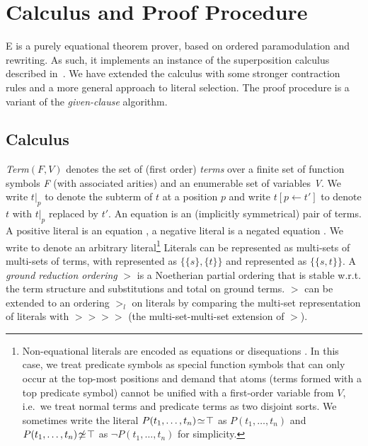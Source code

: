 \documentclass{article}
\begin{document}
\section{Calculus and Proof Procedure}
\label{sec:calculus}

E is a purely equational theorem prover, based on ordered
paramodulation and rewriting. As such, it implements an instance of
the superposition calculus described in~\cite{BG94}. We have extended
the calculus with some stronger contraction rules and a more general
approach to literal selection. The proof procedure is a variant of the
\emph{given-clause} algorithm.


\subsection{Calculus}

\emph{Term}$(F,V)$ denotes the set of (first order)
\emph{terms} over a finite set of function symbols \emph{F} (with
associated arities) and an enumerable set of variables
\emph{V}. We write $t|_p$ to denote the
subterm of $t$ at a position $p$ and write
$t[p\leftarrow t']$ to denote $t$ with $t|_p$ replaced by $t'$. An
equation  is an (implicitly symmetrical)
pair of terms. A positive literal is an equation
, a negative literal is a negated equation .  We
write  to denote an arbitrary
literal\footnote{Non-equational literals are encoded as equations or
  disequations . In this case, we
  treat predicate symbols as special function symbols that can only
  occur at the top-most positions and demand that atoms (terms formed
  with a top predicate symbol) cannot be unified with a first-order
  variable from $V$, i.e.\ we treat normal terms and predicate terms
  as two disjoint sorts. We sometimes write the literal $P(t_1,
    \ldots, t_n)\!\simeq\!\top$ as $P(t_1, \ldots, t_n)$ and $P(t_1,
    \ldots, t_n)\!\not\simeq\!\top$ as $\neg P(t_1, \ldots, t_n)$ for
  simplicity.} Literals can be represented as multi-sets of multi-sets
of terms, with  represented as $\{\{s\},\{t\}\}$ and
 represented as $\{\{s, t\}\}$.  A \emph{ground reduction
  ordering} $>$ is a
Noetherian partial ordering that is stable w.r.t. the term structure
and substitutions and total on ground terms. $>$ can be extended to an
ordering $>_l$ on literals by comparing the multi-set representation
of literals with $>\!\!> >\!\!>$ (the multi-set-multi-set extension of
$>$).
\end{document}
